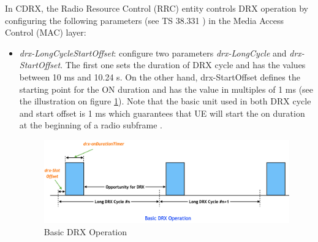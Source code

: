 \documentclass[conference]{IEEEtran}
\begin{document}
    In CDRX, the Radio Resource Control (RRC) entity controls DRX operation by configuring the following parameters (see TS 38.331 \cite{3gpp_nr_nodate-3_38.331}) in the Media Access Control (MAC) layer:

\begin{itemize}
    \item \textit{drx-LongCycleStartOffset}: configure two parameters \textit{drx-LongCycle} and \textit{drx-StartOffset}. The first one sets the duration of DRX cycle and has the values between 10 ms and 10.24 s. On the other hand, drx-StartOffset defines the starting point for the ON duration and has the value in multiples of 1 ms (see the illustration on figure \ref{fig:basic-drx-operation}). Note that the basic unit used in both DRX cycle and start offset is 1 ms which guarantees that UE will start the on duration at the beginning of a radio subframe .

\begin{figure}
    \centering
    \includegraphics[width=\linewidth]{Pictures/Basic DRX Operation.png}
    \caption{Basic DRX Operation}
    \label{fig:basic-drx-operation}
\end{figure}
    

\end{itemize}
\end{document}
